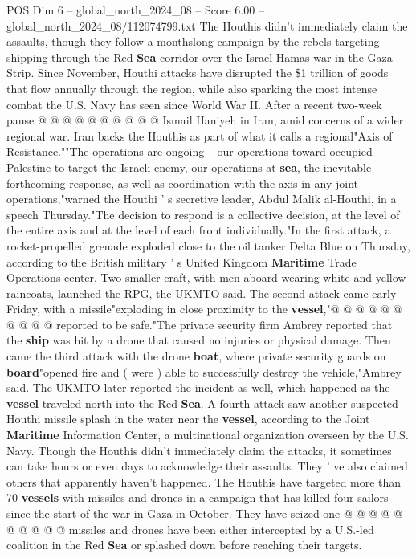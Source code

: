 \begin{textsample}{POS Dim 6 – global\_north\_2024\_08 – Score 6.00 – global\_north\_2024\_08/112074799.txt}
The Houthis didn't immediately claim the assaults, though they follow a monthslong campaign by the rebels targeting shipping through the Red \textbf{Sea} corridor over the Israel-Hamas war in the Gaza Strip.
Since November, Houthi attacks have disrupted the \$1 trillion of goods that flow annually through the region, while also sparking the most intense combat the U.S.
Navy has seen since World War II.
After a recent two-week pause @ @ @ @ @ @ @ @ @ @ Ismail Haniyeh in Iran, amid concerns of a wider regional war.
Iran backs the Houthis as part of what it calls a regional"Axis of Resistance.""The operations are ongoing -- our operations toward occupied Palestine to target the Israeli enemy, our operations at \textbf{sea}, the inevitable forthcoming response, as well as coordination with the axis in any joint operations,"warned the Houthi ' s secretive leader, Abdul Malik al-Houthi, in a speech Thursday."The decision to respond is a collective decision, at the level of the entire axis and at the level of each front individually."In the first attack, a rocket-propelled grenade exploded close to the oil tanker Delta Blue on Thursday, according to the British military ' s United Kingdom \textbf{Maritime} Trade Operations center.
Two smaller craft, with men aboard wearing white and yellow raincoats, launched the RPG, the UKMTO said.
The second attack came early Friday, with a missile"exploding in close proximity to the \textbf{vessel},"@ @ @ @ @ @ @ @ @ @ reported to be safe."The private security firm Ambrey reported that the \textbf{ship} was hit by a drone that caused no injuries or physical damage.
Then came the third attack with the drone \textbf{boat}, where private security guards on \textbf{board}"opened fire and ( were ) able to successfully destroy the vehicle,"Ambrey said.
The UKMTO later reported the incident as well, which happened as the \textbf{vessel} traveled north into the Red \textbf{Sea}.
A fourth attack saw another suspected Houthi missile splash in the water near the \textbf{vessel}, according to the Joint \textbf{Maritime} Information Center, a multinational organization overseen by the U.S.
Navy.
Though the Houthis didn't immediately claim the attacks, it sometimes can take hours or even days to acknowledge their assaults.
They ' ve also claimed others that apparently haven't happened.
The Houthis have targeted more than 70 \textbf{vessels} with missiles and drones in a campaign that has killed four sailors since the start of the war in Gaza in October.
They have seized one @ @ @ @ @ @ @ @ @ @ missiles and drones have been either intercepted by a U.S.-led coalition in the Red \textbf{Sea} or splashed down before reaching their targets.

\end{textsample}
